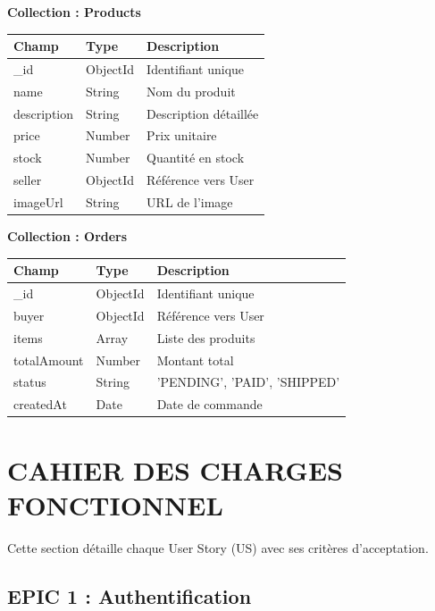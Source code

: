 \documentclass[12pt,a4paper]{article}
\begin{document}
\vspace{1cm}

\textbf{Collection : Products}
\begin{tabularx}{\textwidth}{|l|l|X|}
    \hline
    \textbf{Champ} & \textbf{Type} & \textbf{Description} \\ \hline
    \_id & ObjectId & Identifiant unique \\ \hline
    name & String & Nom du produit \\ \hline
    description & String & Description détaillée \\ \hline
    price & Number & Prix unitaire \\ \hline
    stock & Number & Quantité en stock \\ \hline
    seller & ObjectId & Référence vers User \\ \hline
    imageUrl & String & URL de l'image \\ \hline
\end{tabularx}

\vspace{1cm}

\textbf{Collection : Orders}
\begin{tabularx}{\textwidth}{|l|l|X|}
    \hline
    \textbf{Champ} & \textbf{Type} & \textbf{Description} \\ \hline
    \_id & ObjectId & Identifiant unique \\ \hline
    buyer & ObjectId & Référence vers User \\ \hline
    items & Array & Liste des produits \\ \hline
    totalAmount & Number & Montant total \\ \hline
    status & String & 'PENDING', 'PAID', 'SHIPPED' \\ \hline
    createdAt & Date & Date de commande \\ \hline
\end{tabularx}

\section{CAHIER DES CHARGES FONCTIONNEL}

Cette section détaille chaque User Story (US) avec ses critères d'acceptation.

\subsection{EPIC 1 : Authentification}
\end{document}
